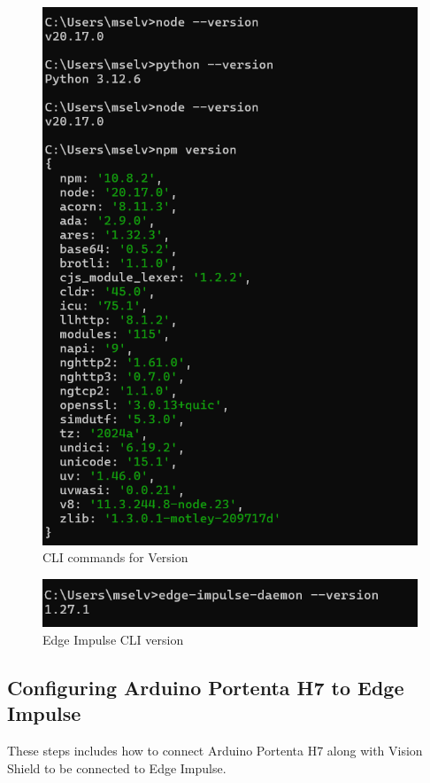 \begin{figure}
	\begin{center}
		\includegraphics[width=0.7\linewidth]{Images/EdgeImpulse/version.png}
		\caption{CLI commands for Version}
		\label{version}
	\end{center}
\end{figure}
\begin{figure}
	\begin{center}
		\includegraphics[width=0.7\linewidth]{Images/EdgeImpulse/edgeImpulseCLIversion.png}
		\caption{Edge Impulse CLI version}
		\label{edgeImpulseCLIversion}
	\end{center}
\end{figure}

\subsection{Configuring Arduino Portenta H7 to Edge Impulse}
These steps includes how to connect Arduino Portenta H7 along with Vision Shield to be connected to Edge Impulse. \cite{edgeimpulse_portenta:2024}

